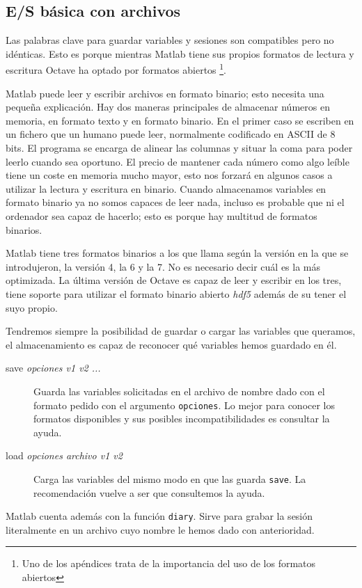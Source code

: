 \subsection{E/S básica con archivos}

Las palabras clave para guardar variables y sesiones son compatibles
pero no idénticas. Esto es porque mientras Matlab tiene sus propios
formatos de lectura y escritura Octave ha optado por formatos
abiertos%
\footnote{Uno de los apéndices trata de la importancia del uso de los
  formatos abiertos%
}.

Matlab puede leer y escribir archivos en formato binario; esto
necesita una pequeña explicación. Hay dos maneras principales de
almacenar números en memoria, en formato texto y en formato binario.
En el primer caso se escriben en un fichero que un humano puede leer,
normalmente codificado en ASCII de 8 bits. El programa se encarga de
alinear las columnas y situar la coma para poder leerlo cuando sea
oportuno. El precio de mantener cada número como algo leíble tiene un
coste en memoria mucho mayor, esto nos forzará en algunos casos a
utilizar la lectura y escritura en binario. Cuando almacenamos
variables en formato binario ya no somos capaces de leer nada, incluso
es probable que ni el ordenador sea capaz de hacerlo; esto es porque
hay multitud de formatos binarios.

Matlab tiene tres formatos binarios a los que llama según la versión
en la que se introdujeron, la versión 4, la 6 y la 7. No es necesario
decir cuál es la más optimizada. La última versión de Octave es capaz
de leer y escribir en los tres, tiene soporte para utilizar el formato
binario abierto \emph{hdf5} además de su tener el suyo propio.

Tendremos siempre la posibilidad de guardar o cargar las variables que
queramos, el almacenamiento es capaz de reconocer qué variables hemos
guardado en él.

\begin{description}
\item [{save \textsl{opciones v1 v2 ...}}]Guarda las
  variables solicitadas en el archivo de nombre dado con el formato
  pedido con el argumento \texttt{opciones}. Lo mejor para conocer los
  formatos disponibles y sus posibles incompatibilidades es consultar
  la ayuda.
\item [{load \textsl{opciones archivo v1 v2}}]Carga las
  variables del mismo modo en que las guarda \texttt{save}. La
  recomendación vuelve a ser que consultemos la ayuda.
\end{description}
Matlab cuenta además con la función \texttt{diary}. Sirve para grabar
la sesión literalmente en un archivo cuyo nombre le hemos dado con
anterioridad.

